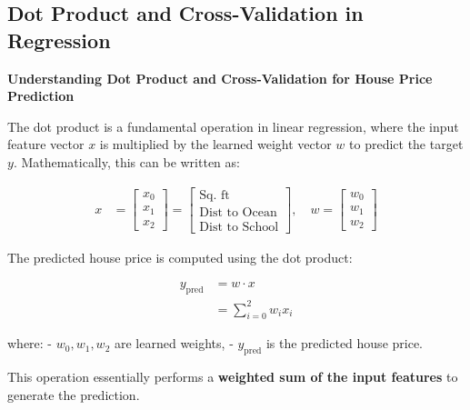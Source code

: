 \subsection{Dot Product and Cross-Validation in Regression}

\begin{center}
    \textbf{Understanding Dot Product and Cross-Validation for House Price Prediction}
\end{center}

\vspace{-0.5cm}

The dot product is a fundamental operation in linear regression, where the input feature vector \( x \) is multiplied by the learned weight vector \( w \) to predict the target \( y \). Mathematically, this can be written as:

\begin{align*}
    x &= \begin{bmatrix}
            x_0 \\ x_1 \\ x_2
         \end{bmatrix} =
         \begin{bmatrix}
            \text{Sq. ft} \\
            \text{Dist to Ocean} \\
            \text{Dist to School}
         \end{bmatrix}, \quad
    w = \begin{bmatrix}
            w_0 \\ w_1 \\ w_2
         \end{bmatrix}
\end{align*}

The predicted house price is computed using the dot product:

\begin{align*}
    y_{\text{pred}} &= w \cdot x \\
    &= \sum_{i=0}^{2} w_i x_i
\end{align*}


where:
- \( w_0, w_1, w_2 \) are learned weights,
- \( y_{\text{pred}} \) is the predicted house price.

This operation essentially performs a \textbf{weighted sum of the input features} to generate the prediction.

